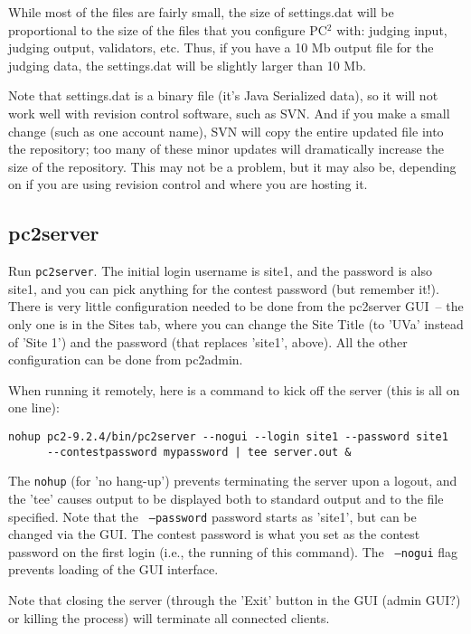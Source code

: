 While most of the files are fairly small, the size of settings.dat
will be proportional to the size of the files that you configure
PC$^2$ with: judging input, judging output, validators, etc.  Thus, if
you have a 10 Mb output file for the judging data, the settings.dat
will be slightly larger than 10 Mb.

Note that settings.dat is a binary file (it's Java Serialized data),
so it will not work well with revision control software, such as SVN.
And if you make a small change (such as one account name), SVN will
copy the entire updated file into the repository; too many of these
minor updates will dramatically increase the size of the repository.
This may not be a problem, but it may also be, depending on if you are
using revision control and where you are hosting it.

\subsection{pc2server}

Run {\tt pc2server}.  The initial login username is site1, and the
password is also site1, and you can pick anything for the contest
password (but remember it!).  There is very little configuration
needed to be done from the pc2server GUI~-- the only one is in the
Sites tab, where you can change the Site Title (to 'UVa' instead of
'Site 1') and the password (that replaces 'site1', above).  All the
other configuration can be done from pc2admin.

When running it remotely, here is a command to kick off the server
(this is all on one line):

\begin{verbatim}
nohup pc2-9.2.4/bin/pc2server --nogui --login site1 --password site1
      --contestpassword mypassword | tee server.out &
\end{verbatim}

The {\tt nohup} (for 'no hang-up') prevents terminating the server
upon a logout, and the 'tee' causes output to be displayed both to
standard output and to the file specified.  Note that the {\tt
--password} password starts as 'site1', but can be changed via the
GUI.  The contest password is what you set as the contest password on
the first login (i.e., the running of this command).  The {\tt
--nogui} flag prevents loading of the GUI interface.

Note that closing the server (through the 'Exit' button in the GUI
(admin GUI?) or killing the process) will terminate all connected
clients.

